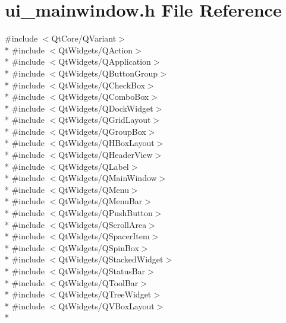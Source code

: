 \hypertarget{a00139}{\section{ui\+\_\+mainwindow.\+h File Reference}
\label{a00139}
}
{\ttfamily \#include $<$Qt\+Core/\+Q\+Variant$>$}\\*
{\ttfamily \#include $<$Qt\+Widgets/\+Q\+Action$>$}\\*
{\ttfamily \#include $<$Qt\+Widgets/\+Q\+Application$>$}\\*
{\ttfamily \#include $<$Qt\+Widgets/\+Q\+Button\+Group$>$}\\*
{\ttfamily \#include $<$Qt\+Widgets/\+Q\+Check\+Box$>$}\\*
{\ttfamily \#include $<$Qt\+Widgets/\+Q\+Combo\+Box$>$}\\*
{\ttfamily \#include $<$Qt\+Widgets/\+Q\+Dock\+Widget$>$}\\*
{\ttfamily \#include $<$Qt\+Widgets/\+Q\+Grid\+Layout$>$}\\*
{\ttfamily \#include $<$Qt\+Widgets/\+Q\+Group\+Box$>$}\\*
{\ttfamily \#include $<$Qt\+Widgets/\+Q\+H\+Box\+Layout$>$}\\*
{\ttfamily \#include $<$Qt\+Widgets/\+Q\+Header\+View$>$}\\*
{\ttfamily \#include $<$Qt\+Widgets/\+Q\+Label$>$}\\*
{\ttfamily \#include $<$Qt\+Widgets/\+Q\+Main\+Window$>$}\\*
{\ttfamily \#include $<$Qt\+Widgets/\+Q\+Menu$>$}\\*
{\ttfamily \#include $<$Qt\+Widgets/\+Q\+Menu\+Bar$>$}\\*
{\ttfamily \#include $<$Qt\+Widgets/\+Q\+Push\+Button$>$}\\*
{\ttfamily \#include $<$Qt\+Widgets/\+Q\+Scroll\+Area$>$}\\*
{\ttfamily \#include $<$Qt\+Widgets/\+Q\+Spacer\+Item$>$}\\*
{\ttfamily \#include $<$Qt\+Widgets/\+Q\+Spin\+Box$>$}\\*
{\ttfamily \#include $<$Qt\+Widgets/\+Q\+Stacked\+Widget$>$}\\*
{\ttfamily \#include $<$Qt\+Widgets/\+Q\+Status\+Bar$>$}\\*
{\ttfamily \#include $<$Qt\+Widgets/\+Q\+Tool\+Bar$>$}\\*
{\ttfamily \#include $<$Qt\+Widgets/\+Q\+Tree\+Widget$>$}\\*
{\ttfamily \#include $<$Qt\+Widgets/\+Q\+V\+Box\+Layout$>$}\\*

